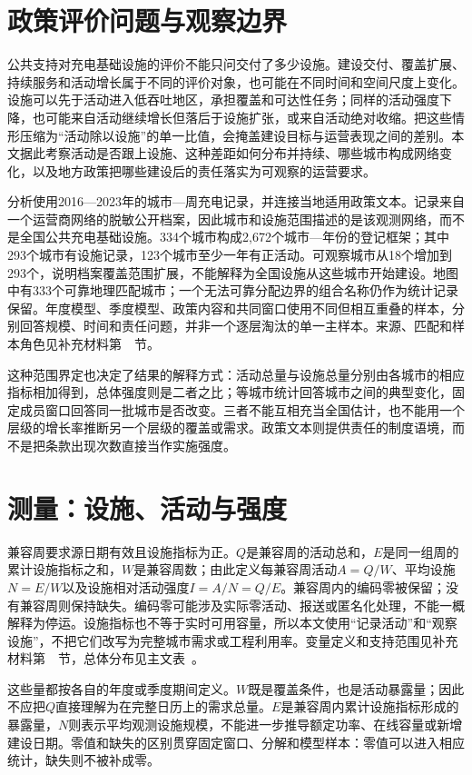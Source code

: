 \section*{政策评价问题与观察边界}
公共支持对充电基础设施的评价不能只问交付了多少设施。建设交付、覆盖扩展、持续服务和活动增长属于不同的评价对象，也可能在不同时间和空间尺度上变化。设施可以先于活动进入低吞吐地区，承担覆盖和可达性任务；同样的活动强度下降，也可能来自活动继续增长但落后于设施扩张，或来自活动绝对收缩。把这些情形压缩为“活动除以设施”的单一比值，会掩盖建设目标与运营表现之间的差别。本文据此考察活动是否跟上设施、这种差距如何分布并持续、哪些城市构成网络变化，以及地方政策把哪些建设后的责任落实为可观察的运营要求。

分析使用2016—2023年的城市—周充电记录，并连接当地适用政策文本。记录来自一个运营商网络的脱敏公开档案\citep{ma2026}，因此城市和设施范围描述的是该观测网络，而不是全国公共充电基础设施。334个城市构成2,672个城市—年份的登记框架；其中293个城市有设施记录，123个城市至少一年有正活动。可观察城市从18个增加到293个，说明档案覆盖范围扩展，不能解释为全国设施从这些城市开始建设。地图中有333个可靠地理匹配城市；一个无法可靠分配边界的组合名称仍作为统计记录保留。年度模型、季度模型、政策内容和共同窗口使用不同但相互重叠的样本，分别回答规模、时间和责任问题，并非一个逐层淘汰的单一主样本。来源、匹配和样本角色见补充材料第~~节。

这种范围界定也决定了结果的解释方式：活动总量与设施总量分别由各城市的相应指标相加得到，总体强度则是二者之比；等城市统计回答城市之间的典型变化，固定成员窗口回答同一批城市是否改变。三者不能互相充当全国估计，也不能用一个层级的增长率推断另一个层级的覆盖或需求。政策文本则提供责任的制度语境，而不是把条款出现次数直接当作实施强度。

\section*{测量：设施、活动与强度}
兼容周要求源日期有效且设施指标为正。$Q$是兼容周的活动总和，$E$是同一组周的累计设施指标之和，$W$是兼容周数；由此定义每兼容周活动$A=Q/W$、平均设施$N=E/W$以及设施相对活动强度$I=A/N=Q/E$。兼容周内的编码零被保留；没有兼容周则保持缺失。编码零可能涉及实际零活动、报送或匿名化处理，不能一概解释为停运。设施指标也不等于实时可用容量，所以本文使用“记录活动”和“观察设施”，不把它们改写为完整城市需求或工程利用率。变量定义和支持范围见补充材料第~~节，总体分布见主文表~。

这些量都按各自的年度或季度期间定义。$W$既是覆盖条件，也是活动暴露量；因此不应把$Q$直接理解为在完整日历上的需求总量。$E$是兼容周内累计设施指标形成的暴露量，$N$则表示平均观测设施规模，不能进一步推导额定功率、在线容量或新增建设日期。零值和缺失的区别贯穿固定窗口、分解和模型样本：零值可以进入相应统计，缺失则不被补成零。

